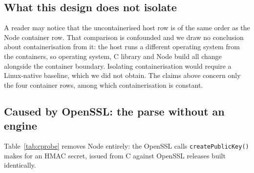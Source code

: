 \documentclass[pdflatex,sn-basic,twocolumn]{sn-jnl}%
\begin{document}
\subsection{What this design does not isolate}

A reader may notice that the uncontainerised host row is of the same order as the
Node \NodeTwentySixGlibcNodeMajor{} container row. That comparison is confounded
and we draw no conclusion about containerisation from it: the host runs a
different operating system from the containers, so operating system, C library
and Node build all change alongside the container boundary. Isolating
containerisation would require a Linux-native baseline, which we did not obtain.
The claims above concern only the four container rows, among which
containerisation is constant.

\subsection{Caused by OpenSSL: the parse without an engine}\label{sec:rq2-causal}

Table~\ref{tab:cprobe} removes Node entirely: the OpenSSL calls
\texttt{createPublicKey()} makes for an HMAC secret, issued from C against
\CProbeVersionCount{} OpenSSL releases built identically.
\end{document}
